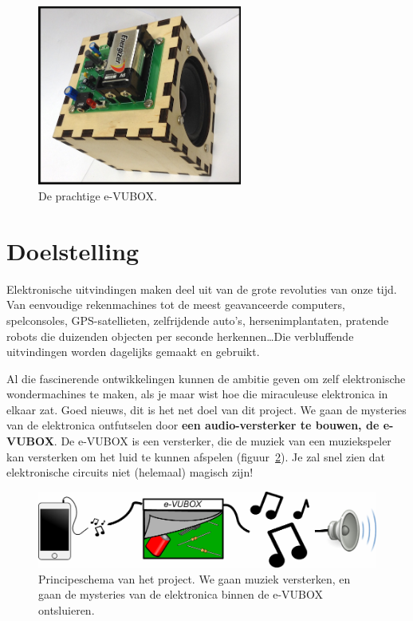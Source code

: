\documentclass{article}
\begin{document}
	
	\maketitle

	\begin{figure}[htbp]
		\centering
		\includegraphics[width=0.6\textwidth]{foto.jpg}
		\caption{De prachtige e-VUBOX.}
		\label{fig:foto}
	\end{figure}

	\clearpage
	\tableofcontents
	\clearpage

	\section{Doelstelling}
		Elektronische uitvindingen maken deel uit van de grote revoluties van onze tijd. Van eenvoudige rekenmachines tot de meest geavanceerde computers, spelconsoles, GPS-satellieten, zelfrijdende auto's, hersenimplantaten, pratende robots die duizenden objecten per seconde herkennen\ldots Die verbluffende uitvindingen worden dagelijks gemaakt en gebruikt.

		Al die fascinerende ontwikkelingen kunnen de ambitie geven om zelf elektronische wondermachines te maken, als je maar wist hoe die miraculeuse elektronica in elkaar zat. Goed nieuws, dit is het net doel van dit project. We gaan de mysteries van de elektronica ontfutselen door \textbf{een audio-versterker te bouwen, de e-VUBOX}. De e-VUBOX is een versterker, die de muziek van een  muziekspeler kan versterken om het luid te kunnen afspelen (figuur~\ref{fig:principe}).  Je zal snel zien dat elektronische circuits niet (helemaal) magisch zijn!
	\begin{figure}[htbp]
		\centering
		\includegraphics[scale=0.85]{principe}
		\caption{Principeschema van het project. We gaan muziek versterken, en gaan de mysteries van de elektronica binnen de e-VUBOX ontsluieren.}
		\label{fig:principe}
	\end{figure}
\end{document}
